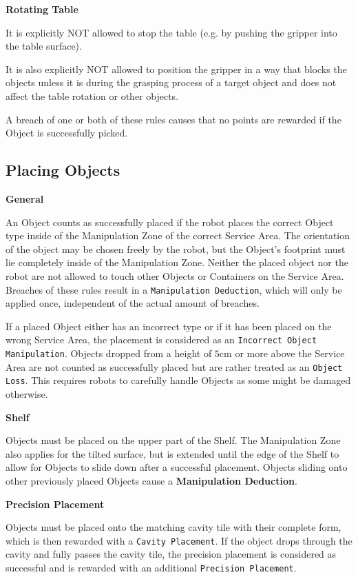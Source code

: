 \textbf{Rotating Table}

It is explicitly NOT allowed to stop the table (e.g. by pushing the gripper into the table surface).

It is also explicitly NOT allowed to position the gripper in a way that blocks the objects 
unless it is during the grasping process of a target object and does not affect the table rotation or other objects.

A breach of one or both of these rules causes that no points are rewarded if the Object is successfully picked.

\subsection{Placing Objects} \label{ssec:PlacingObjects}

\textbf{General}

An Object counts as successfully placed if the robot places the correct Object type inside of the Manipulation Zone of the correct Service Area. The orientation of the object may be chosen freely by the robot, but the Object's footprint must lie completely inside of the Manipulation Zone.
Neither the placed object nor the robot are not allowed to touch other Objects or Containers on the Service Area.
Breaches of these rules result in a \texttt{Manipulation Deduction}, which will only be applied once, independent of the actual amount of breaches.

If a placed Object either has an incorrect type or if it has been placed on the wrong Service Area, 
the placement is considered as an \texttt{Incorrect Object Manipulation}. 
Objects dropped from a height of $5\si{\centi\meter}$ or more above the Service Area are not counted as successfully placed but are rather treated as an \texttt{Object Loss}. This requires robots to carefully handle Objects as some might be damaged otherwise.


\textbf{Shelf}

Objects must be placed on the upper part of the Shelf.
The Manipulation Zone also applies for the tilted surface, but is extended until the edge of the Shelf to allow for Objects to slide down after a successful placement. Objects sliding onto other previously placed Objects cause a \textbf{Manipulation Deduction}.

\clearpage

\textbf{Precision Placement}

Objects must be placed onto the matching cavity tile with their complete form, which is then rewarded with a \texttt{Cavity Placement}.
If the object drops through the cavity and fully passes the cavity tile, the precision placement is considered as successful and is rewarded with an additional \texttt{Precision Placement}. 


